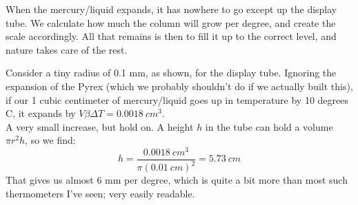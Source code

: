 \begin{figure}[H]
  \centering
{}
\end{figure}

When the mercury/liquid expands, it has nowhere to go except up the display tube. We calculate how much the column will grow per degree, and create the scale accordingly. All that remains is then to fill it up to the correct level, and nature takes care of the rest.

Consider a tiny radius of 0.1 mm, as shown, for the display tube. Ignoring the expansion of the Pyrex (which we probably shouldn't do if we actually built this), if our 1 cubic centimeter of mercury/liquid goes up in temperature by 10 degrees C, it expands by $V \beta \Delta T = \SI{0.0018}{cm^3}$.\\
A very small increase, but hold on. A height $h$ in the tube can hold a volume $\pi r^2 h$, so we find:
\begin{equation*}
  h = \frac{\SI{0.0018}{cm^3}}{\pi (\SI{0.01}{cm})^2} = \SI{5.73}{cm}
\end{equation*}
That gives us almost 6 mm per degree, which is quite a bit more than most such thermometers I've seen; very easily readable.

